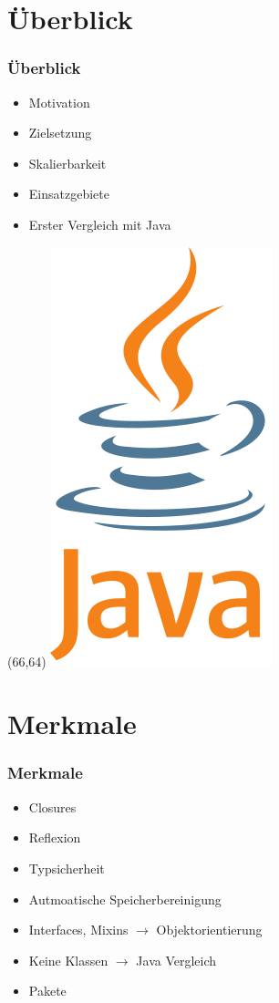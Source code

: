 \documentclass{beamer}
\begin{document}
\section{\"Uberblick}
\begin{frame}
\frametitle{\"Uberblick}

\begin{itemize}
\setlength{\itemsep}{20pt}
\item Motivation
\item Zielsetzung
\item Skalierbarkeit
\item Einsatzgebiete
\item Erster Vergleich mit Java\texttrademark
\end{itemize}

\begin{textblock}{20}(66,64)
\includegraphics[scale=0.1]{javalogo.png}
\end{textblock}

\end{frame}

\section{Merkmale}
\begin{frame}
\frametitle{Merkmale}

\begin{itemize}
\setlength{\itemsep}{16pt}
\item Closures
\item Reflexion
\item Typsicherheit
\item Autmoatische Speicherbereinigung
\item Interfaces, Mixins $\rightarrow$ Objektorientierung
\item Keine Klassen $\rightarrow$ Java Vergleich
\item Pakete
\end{itemize}

\end{frame}
\end{document}
